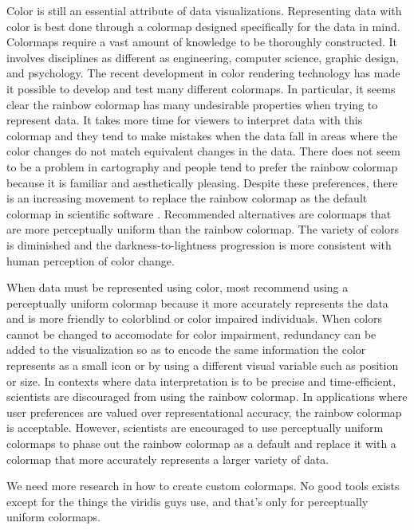 \documentclass[journal,12pt]{IEEEtran}
\begin{document}
Color is still an essential attribute of data visualizations. Representing data
with color is best done through a colormap designed specifically for the data in
mind.
Colormaps require a vast amount of knowledge to be thoroughly constructed. It 
involves disciplines as different as engineering, computer science, graphic design,
and psychology. The recent development in color rendering technology has made it 
possible to develop and test many different colormaps. In particular, it seems clear
the rainbow colormap has many undesirable properties when trying to represent data.
It takes more time for viewers to interpret data with this colormap and they tend to
make mistakes when the data fall in areas where the color changes do not match 
equivalent changes in the data. There does not seem to be a problem in cartography
and people tend to prefer the rainbow colormap because it is familiar and aesthetically pleasing.
Despite these preferences, there is an increasing movement to replace the rainbow
colormap as the default colormap in scientific software \cite{matlab}. Recommended
alternatives are colormaps that are more perceptually uniform than the rainbow 
colormap. The variety of colors is diminished and the darkness-to-lightness progression
is more consistent with human perception of color change.

When data must be represented using color, most recommend using a perceptually
uniform colormap because it more accurately represents the data and is more 
friendly to colorblind or color impaired individuals. When colors cannot be changed
to accomodate for color impairment, redundancy can be added to the visualization
so as to encode the same information the color represents as a small icon or by using
a different visual variable such as position or size. In contexts where data
interpretation is to be precise and time-efficient, scientists are discouraged from
using the rainbow colormap. In applications where user preferences are valued over representational accuracy, the rainbow colormap is acceptable. However, scientists
are encouraged to use perceptually uniform colormaps to phase out the rainbow colormap
as a default and replace it with a colormap that more accurately represents a larger
variety of data.

We need more research in how to create custom colormaps. No good tools exists except for the things the viridis guys use, and that's only for perceptually uniform colormaps.


\ifCLASSOPTIONcaptionsoff
  \newpage
\fi
\end{document}
